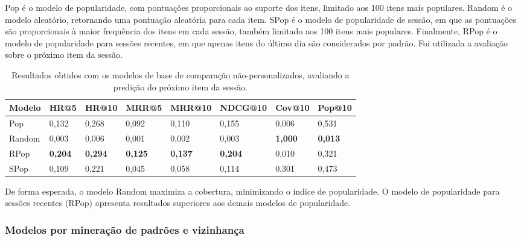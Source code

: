   Pop é o modelo de popularidade, com pontuações proporcionais ao suporte dos
  itens, limitado aos 100 itens mais populares. Random é o modelo aleatório,
  retornando uma pontuação aleatória para cada item. SPop é o modelo de
  popularidade de sessão, em que as pontuações são proporcionais à maior
  frequência dos itens em cada sessão, também limitado aos 100 itens mais
  populares. Finalmente, RPop é o modelo de popularidade para sessões recentes,
  em que apenas itens do último dia são considerados por padrão. Foi utilizada a
  avaliação sobre o próximo item da sessão.
\begin{table}[htbp]
  \centering
  \begin{tabular}
    {|l|l|l|l|l|l|l|l|}
    \hline
    Modelo & HR@5 & HR@10 & MRR@5 & MRR@10 & NDCG@10 & Cov@10 & Pop@10 \\ \hline
    Pop & 0,132 & 0,268 & 0,092 & 0,110 & 0,155 & 0,006 & 0,531 \\ \hline
    Random & 0,003 & 0,006 & 0,001 & 0,002 & 0,003 & \textbf{1,000} & \textbf{0,013} \\ \hline
    RPop & \textbf{0,204} & \textbf{0,294} & \textbf{0,125} & \textbf{0,137} & \textbf{0,204} & 0,010 & 0,321 \\ \hline
    SPop & 0,109 & 0,221 & 0,045 & 0,058 & 0,114 & 0,301 & 0,473 \\ \hline
  \end{tabular}
  \caption{Resultados obtidos com os modelos de base de comparação não-personalizados, avaliando a predição do próximo item da sessão.}
\end{table}

De forma esperada, o modelo Random maximiza a cobertura, minimizando o índice de
popularidade. O modelo de popularidade para sessões recentes (RPop) apresenta
resultados superiores aos demais modelos de popularidade.


\subsubsection{Modelos por mineração de padrões e vizinhança}

